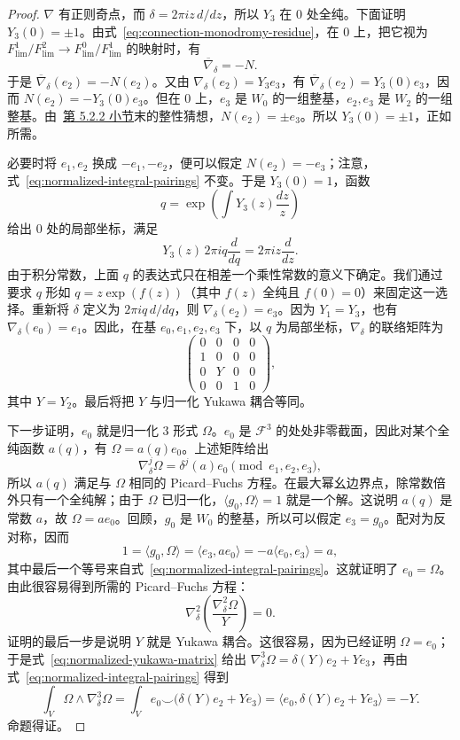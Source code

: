 \begin{proof}
$\nabla$ 有正则奇点，而 $\delta=2\pi iz\,d/dz$，所以 $Y_3$ 在 $0$ 处全纯。下面证明 $Y_3(0)=\pm1$。由式~\eqref{eq:connection-monodromy-residue}，在 $0$ 上，把它视为
$F_{\mathrm{lim}}^1/F_{\mathrm{lim}}^2\to F_{\mathrm{lim}}^0/F_{\mathrm{lim}}^1$ 的映射时，有
\[
\overline\nabla_\delta=-N.
\]
于是 $\overline\nabla_\delta(e_2)=-N(e_2)$。又由
$\nabla_\delta(e_2)=Y_3e_3$，有
$\overline\nabla_\delta(e_2)=Y_3(0)e_3$，因而
$N(e_2)=-Y_3(0)e_3$。但在 $0$ 上，$e_3$ 是 $W_0$ 的一组整基，$e_2,e_3$ 是 $W_2$ 的一组整基。由~\hyperref[subsec:higher-dimensional-mum]{第 5.2.2 小节}末的整性猜想，$N(e_2)=\pm e_3$。所以 $Y_3(0)=\pm1$，正如所需。

必要时将 $e_1,e_2$ 换成 $-e_1,-e_2$，便可以假定 $N(e_2)=-e_3$；注意，式~\eqref{eq:normalized-integral-pairings} 不变。于是 $Y_3(0)=1$，函数
\[
q=\exp\left(\int Y_3(z)\frac{dz}{z}\right)
\]
给出 $0$ 处的局部坐标，满足
\[
Y_3(z)\,2\pi iq\frac d{dq}=2\pi iz\frac d{dz}.
\]
由于积分常数，上面 $q$ 的表达式只在相差一个乘性常数的意义下确定。我们通过要求 $q$ 形如 $q=z\exp(f(z))$（其中 $f(z)$ 全纯且 $f(0)=0$）来固定这一选择。重新将 $\delta$ 定义为 $2\pi iq\,d/dq$，则 $\nabla_\delta(e_2)=e_3$。因为 $Y_1=Y_3$，也有 $\nabla_\delta(e_0)=e_1$。因此，在基 $e_0,e_1,e_2,e_3$ 下，以 $q$ 为局部坐标，$\nabla_\delta$ 的联络矩阵为
\begin{equation}\label{eq:normalized-yukawa-matrix}
\begin{pmatrix}
0&0&0&0\\1&0&0&0\\0&Y&0&0\\0&0&1&0
\end{pmatrix},
\end{equation}
其中 $Y=Y_2$。最后将把 $Y$ 与归一化 Yukawa 耦合等同。

下一步证明，$e_0$ 就是归一化 $3$ 形式 $\Omega$。$e_0$ 是 $\mathcal F^3$ 的处处非零截面，因此对某个全纯函数 $a(q)$，有 $\Omega=a(q)e_0$。上述矩阵给出
\[
\nabla_\delta^j\Omega=\delta^j(a)e_0\pmod{e_1,e_2,e_3},
\]
所以 $a(q)$ 满足与 $\Omega$ 相同的 Picard--Fuchs 方程。在最大幂幺边界点，除常数倍外只有一个全纯解；由于 $\Omega$ 已归一化，$\langle g_0,\Omega\rangle=1$ 就是一个解。这说明 $a(q)$ 是常数 $a$，故 $\Omega=ae_0$。回顾，$g_0$ 是 $W_0$ 的整基，所以可以假定 $e_3=g_0$。配对为反对称，因而
\[
1=\langle g_0,\Omega\rangle=\langle e_3,ae_0\rangle
=-a\langle e_0,e_3\rangle=a,
\]
其中最后一个等号来自式~\eqref{eq:normalized-integral-pairings}。这就证明了 $e_0=\Omega$。由此很容易得到所需的 Picard--Fuchs 方程：
\begin{equation}\label{eq:normalized-yukawa-pf}
\nabla_\delta^2\left(\frac{\nabla_\delta^2\Omega}{Y}\right)=0.
\end{equation}
证明的最后一步是说明 $Y$ 就是 Yukawa 耦合。这很容易，因为已经证明 $\Omega=e_0$；于是式~\eqref{eq:normalized-yukawa-matrix} 给出 $\nabla_\delta^3\Omega=\delta(Y)e_2+Ye_3$，再由式~\eqref{eq:normalized-integral-pairings} 得到
\[
\int_V\Omega\wedge\nabla_\delta^3\Omega
=\int_V e_0\smile\bigl(\delta(Y)e_2+Ye_3\bigr)
=\langle e_0,\delta(Y)e_2+Ye_3\rangle=-Y.
\]
命题得证。
\end{proof}

